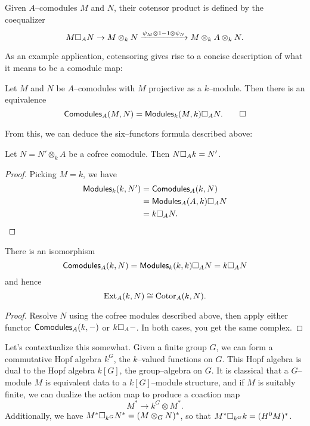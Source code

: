 \begin{definition}
Given $A$--comodules $M$ and $N$, their cotensor product is defined by the coequalizer \[M \square_A N \to M \otimes_k N \xrightarrow{\psi_M \otimes 1 - 1 \otimes \psi_N} M \otimes_k A \otimes_k N.\]
\end{definition}

\noindent As an example application, cotensoring gives rise to a concise description of what it means to be a comodule map:

\begin{lemma}
Let $M$ and $N$ be $A$--comodules with $M$ projective as a $k$--module.  Then there is an equivalence \[\mathsf{Comodules}_A(M, N) = \mathsf{Modules}_k(M, k) \square_A N. \qed\]
\end{lemma}

\noindent From this, we can deduce the six--functors formula described above:

\begin{corollary}
Let $N = N' \otimes_k A$ be a cofree comodule. Then $N \square_A k = N'$.
\end{corollary}
\begin{proof}
Picking $M = k$, we have
\begin{align*}
\mathsf{Modules}_k(k, N') & = \mathsf{Comodules}_A(k, N) \\
& = \mathsf{Modules}_A(A, k) \square_A N \\
& = k \square_A N. \qedhere
\end{align*}
\end{proof}

\begin{corollary}
There is an isomorphism \[\mathsf{Comodules}_A(k, N) = \mathsf{Modules}_k(k, k) \square_A N = k \square_A N\] and hence \[\operatorname{Ext}_A(k, N) \cong \operatorname{Cotor}_A(k, N).\]
\end{corollary}
\begin{proof}
Resolve $N$ using the cofree modules described above, then apply either functor $\mathsf{Comodules}_A(k, -)$ or $k \square_A -$.  In both cases, you get the same complex.
\end{proof}


\begin{example}\label{HopfAlgebrasFromFiniteGroups}
Let's contextualize this somewhat.  Given a finite group $G$, we can form a commutative Hopf algebra $k^G$, the $k$--valued functions on $G$.  This Hopf algebra is dual to the Hopf algebra $k[G]$, the group--algebra on $G$.  It is classical that a $G$--module $M$ is equivalent data to a $k[G]$--module structure, and if $M$ is suitably finite, we can dualize the action map to produce a coaction map \[M^* \to k^G \otimes M^*.\]  Additionally, we have $M^* \square_{k^G} N^* = (M \otimes_G N)^*$, so that $M^* \square_{k^G} k = (H^0 M)^*$.
\end{example}

